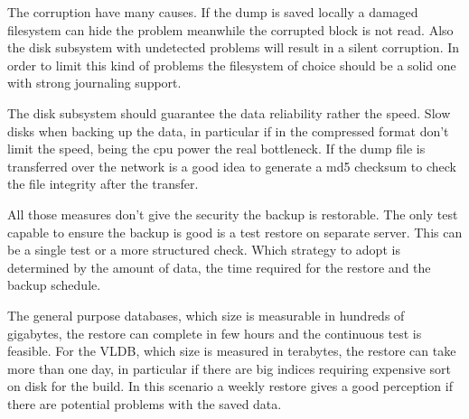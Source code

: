 The corruption have many causes. If the dump is saved locally a damaged filesystem can hide the 
problem meanwhile the corrupted block is not read. Also the disk subsystem with undetected problems 
will result in a silent corruption. In order to limit this kind of problems the filesystem of 
choice should be a solid one with strong journaling support.\newline

The disk subsystem should guarantee the data reliability rather the speed. Slow disks when backing 
up the data, in particular if in the compressed format don't limit the speed, being the cpu power 
the real bottleneck.\newline
If the dump file is transferred over the network is a good idea to generate a md5 checksum to 
check the file integrity after the transfer.\newline

All those measures don't give the security the backup is restorable. The only test capable to 
ensure the backup is good is a test restore on separate server. This can be a single test or a more 
structured check. Which strategy to adopt is determined by the amount of data, the time required 
for the restore and the backup schedule.\newline

The general purpose databases, which size is measurable in hundreds of gigabytes, the restore can 
complete in few hours and the continuous test is feasible. For the VLDB, which size is measured in 
terabytes, the restore can take more than one day, in particular if there are big indices requiring 
expensive sort on disk for the build. In this scenario a weekly restore gives a good perception if 
there are potential problems with the saved data. 